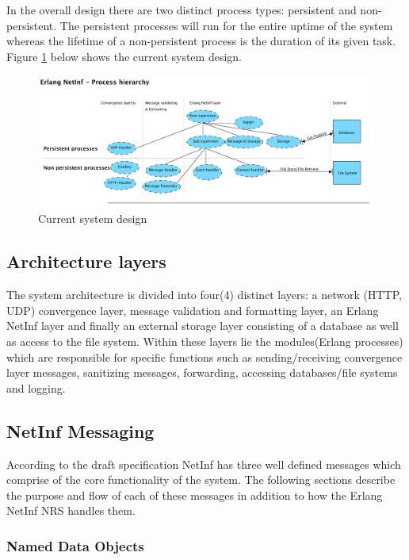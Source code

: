 

In the overall design there are two distinct process types: persistent and non-persistent. The persistent processes will run for the entire uptime of the system whereas the lifetime of a non-persistent process is the duration of its given task. Figure \ref{fig:processhi} below shows the current system design.

\begin{figure}[H]
	\centering
\centerline{\includegraphics[width=1.2\textwidth]{./img/process_hierarchy.png}}
\caption{Current system design}
\label{fig:processhi}
\end{figure}

\subsection{Architecture layers}

The system architecture is divided into four(4) distinct layers: a network (HTTP, UDP) convergence layer, message validation and formatting layer, an Erlang NetInf layer and finally an external storage layer consisting of a database as well as access to the file system. Within these layers lie the modules(Erlang processes) which are responsible for specific functions such as sending/receiving convergence layer messages, sanitizing messages, forwarding, accessing databases/file systems and logging.

\subsection{NetInf Messaging}

According to the draft specification\cite{netinfproto} NetInf has three well defined messages which comprise of the core functionality of the system. The following sections describe the purpose and flow of each of these messages in addition to how the Erlang NetInf NRS handles them.

\subsubsection{Named Data Objects}

